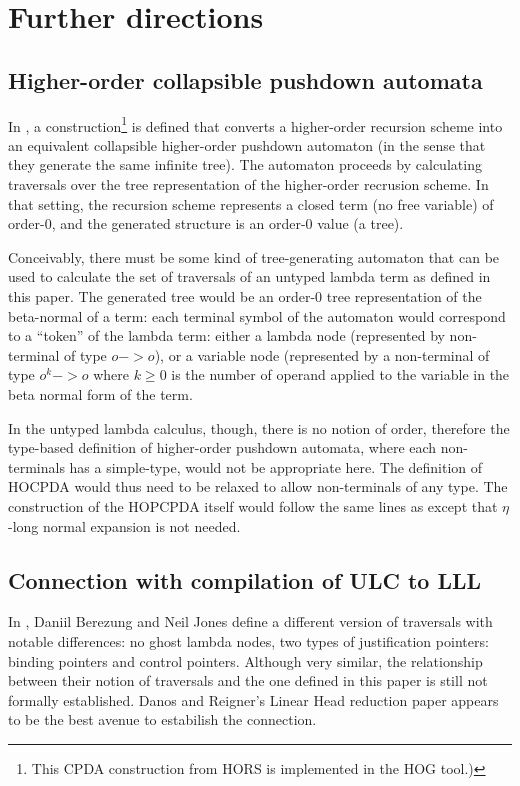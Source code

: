 \documentclass{article}
\theoremstyle{definition}
\begin{document}
\section{Further directions}

\subsection{Higher-order collapsible pushdown automata}

In \cite{Ong2006}, a construction\footnote{This CPDA construction from HORS is implemented in the HOG tool.)}
 is defined that converts a higher-order recursion scheme into an equivalent collapsible higher-order pushdown automaton (in the sense that they generate the same infinite tree). The automaton proceeds by calculating traversals over the tree representation of the higher-order recrusion scheme. In that setting, the recursion scheme represents a closed term (no free variable) of order-$0$, and the generated structure is an order-$0$ value (a tree).

Conceivably, there must be some kind of tree-generating automaton that can be used to calculate the set of traversals of an untyped lambda term as defined in this paper. The generated tree would be an order-$0$ tree representation of the beta-normal of a term: each terminal symbol of the automaton would correspond to a ``token'' of the lambda term: either a lambda node (represented by non-terminal of type $o->o$), or a variable node (represented by a non-terminal of type $o^k->o$ where $k\geq0$ is the number of operand applied to the variable in the beta normal form of the term.

In the untyped lambda calculus, though, there is no notion of order, therefore the type-based definition of higher-order pushdown automata, where each non-terminals has a simple-type, would not be appropriate here. The definition of HOCPDA would thus need to be relaxed to allow non-terminals of any type. The construction of the HOPCPDA itself would follow the same lines as \cite{Ong2006} except that $\eta$-long normal expansion is not needed.

\subsection{Connection with compilation of ULC to LLL}

In \cite{JonesBerezunLLL}, Daniil Berezung and Neil Jones define a different version of traversals with notable differences: no ghost lambda nodes, two types of justification pointers: binding pointers and control pointers. Although very similar, the relationship between their notion of traversals and the one defined in this paper is still not formally established. Danos and Reigner's Linear Head reduction paper \cite{danos-head} appears to be the best avenue to estabilish the connection.
\end{document}
